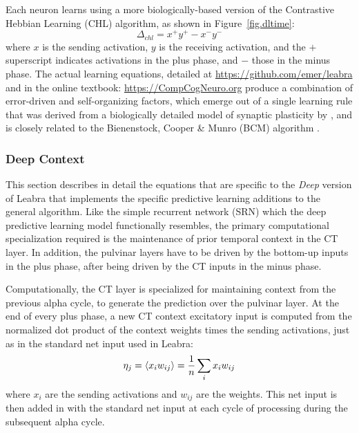 Each neuron learns using a more biologically-based version of the Contrastive Hebbian Learning (CHL) algorithm, as shown in Figure~\ref{fig.dltime}:
\begin{equation}
 \Delta_{chl} = x^+ y^+ - x^- y^-
 \label{eq:chl}
\end{equation}
where $x$ is the sending activation, $y$ is the receiving activation, and the $+$ superscript indicates activations in the plus phase, and $-$ those in the minus phase.  The actual learning equations, detailed at \url{https://github.com/emer/leabra} and in the online textbook: \url{https://CompCogNeuro.org} produce a combination of error-driven and self-organizing factors, which  emerge out of a single learning rule that was derived from a biologically detailed model of synaptic plasticity by \citep{UrakuboHondaFroemkeEtAl08}, and is closely related to the Bienenstock, Cooper \& Munro (BCM) algorithm \citep{BienenstockCooperMunro82}.

\subsubsection{Deep Context}

This section describes in detail the equations that are specific to the {\em Deep} version of Leabra that implements the specific predictive learning additions to the general algorithm.  Like the simple recurrent network (SRN) \citep{Elman90,Jordan89} which the deep predictive learning model functionally resembles, the primary computational specialization required is the maintenance of prior temporal context in the CT layer.  In addition, the pulvinar layers have to be driven by the bottom-up inputs in the plus phase, after being driven by the CT inputs in the minus phase.

Computationally, the CT layer is specialized for maintaining context from the previous alpha cycle, to generate the prediction over the pulvinar layer.  At the end of every plus phase, a new CT context excitatory input is computed from the normalized dot product of the context weights times the sending activations, just as in the standard net input used in Leabra:
\begin{equation}
  \eta_j = \langle x_i w_{ij} \rangle = \frac{1}{n} \sum_i x_i w_{ij}
 \label{eq.netin_ti}
\end{equation}
where $x_i$ are the sending activations and $w_{ij}$ are the weights.  This net input is then added in with the standard net input at each cycle of processing during the subsequent alpha cycle.


